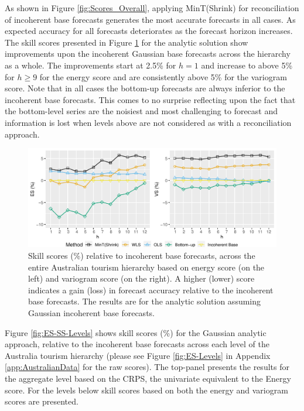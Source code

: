 \documentclass[12pt]{article}
\theoremstyle{definition}
\begin{document}
As shown in Figure \ref{fig:Scores_Overall}, applying MinT(Shrink) for reconciliation of incoherent base forecasts generates the most accurate forecasts in all cases. As expected accuracy for all forecasts deteriorates as the forecast horizon increases. The skill scores presented in Figure \ref{fig:SkillScores_Overall} for the analytic solution show improvements upon the incoherent Gaussian base forecasts across the hierarchy as a whole. The improvements start at 2.5\% for $h=1$ and increase to above 5\% for $h\ge 9$ for the energy score and are consistently above 5\% for the variogram score. Note that in all cases the bottom-up forecasts are always inferior to the incoherent base forecasts. This comes to no surprise reflecting upon the fact that the bottom-level series are the noisiest and most challenging to forecast and information is lost when levels above are not considered as with a reconciliation approach.

\begin{figure}
	\centering
	\small
    \includegraphics[width=.95\textwidth]{Empirical-results/Results-ARIMA/SkillScore_Overall.pdf}
	\caption{Skill scores (\%) relative to incoherent base forecasts, across the entire Australian tourism hierarchy based on energy score (on the left) and variogram score (on the right). A higher (lower) score indicates a gain (loss) in forecast accuracy relative to the incoherent base forecasts. The results are for the analytic solution assuming Gaussian incoherent base forecasts.} \label{fig:SkillScores_Overall}
\end{figure}

Figure \ref{fig:ES-SS-Levels} shows skill scores (\%) for the Gaussian analytic approach, relative to the incoherent base forecasts across each level of the Australia tourism hierarchy (please see Figure \ref{fig:ES-Levels} in Appendix \ref{app:AustralianData} for the raw scores). The top-panel presents the results for the aggregate level based on the CRPS, the univariate equivalent to the Energy score. For the levels below skill scores based on both the energy and variogram scores are presented.
\end{document}
